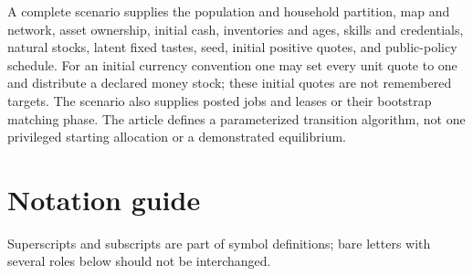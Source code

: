 \documentclass[10pt,a4paper,twocolumn]{article}
\begin{document}
\endgroup

A complete scenario supplies the population and household partition,
map and network, asset ownership, initial cash, inventories and ages,
skills and credentials, natural stocks, latent fixed tastes, seed,
initial positive quotes, and public-policy schedule. For an initial
currency convention one may set every unit quote to one and distribute a
declared money stock; these initial quotes are not remembered targets.
The scenario also supplies posted jobs and leases or their bootstrap
matching phase. The article defines a parameterized transition algorithm,
not one privileged starting allocation or a demonstrated equilibrium.


\section{Notation guide}\label{app:notation}
Superscripts and subscripts are part of symbol definitions; bare letters
with several roles below should not be interchanged.
\end{document}
